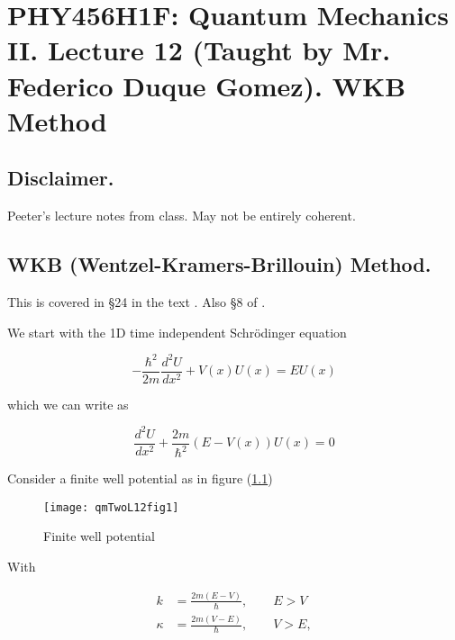
%

\chapter{PHY456H1F: Quantum Mechanics II.  Lecture 12 (Taught by Mr. Federico Duque Gomez).  WKB Method}
\label{chap:qmTwoL12}
{}
\date{Oct 19, 2011}

\beginArtWithToc

\section{Disclaimer.}

Peeter's lecture notes from class.  May not be entirely coherent.

\section{WKB (Wentzel-Kramers-Brillouin) Method.}

This is covered in \S 24 in the text \cite{desai2009quantum}.  Also \S 8 of \cite{griffiths2005introduction}.

We start with the 1D time independent Schr\"{o}dinger equation

\begin{equation}\label{eqn:qmTwoL12:10}
-\frac{\hbar^2}{2m} \frac{d^2 U}{dx^2} + V(x) U(x) = E U(x)
\end{equation}

which we can write as

\begin{equation}\label{eqn:qmTwoL12:30}
\frac{d^2 U}{dx^2} + \frac{2m}{\hbar^2} (E - V(x)) U(x) = 0
\end{equation}

Consider a finite well potential as in figure (\ref{fig:qmTwoL13:qmTwoL12fig1})

\begin{figure}[htp]
   \centering
   \texttt{[image: qmTwoL12fig1]}
   \caption{Finite well potential}\label{fig:qmTwoL13:qmTwoL12fig1}
\end{figure}

With

\begin{align}\label{eqn:qmTwoL12:90}
k &= \frac{2m (E - V)}{\hbar},\qquad E > V \\
\kappa &= \frac{2m (V - E)}{\hbar}, \qquad V > E,
\end{align}

